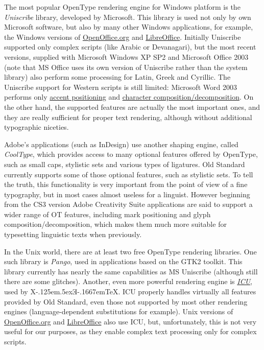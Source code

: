 \documentclass[12pt,a4paper,openany]{book}
\providecommand{\XeTeX}{X\kern-.125em\lower.5ex\hbox{Ǝ}\kern-.1667em\TeX}
\begin{document}
The most popular OpenType rendering engine for Windows platform is the
\textit{Uniscribe} library, developed by Microsoft. This library is used
not only by own Microsoft software, but also by many other Windows
applications, for example, the Windows versions of
\href{http://www.openoffice.org}{OpenOffice.org} and
\href{http://www.libreoffice.org}{LibreOffice}. Initially Uniscribe
supported only complex scripts (like Arabic or Devanagari), but the most
recent versions, supplied with Microsoft Windows XP SP2 and Microsoft
Office 2003 (note that MS Office uses its own version of Uniscribe rather
than the system library) also perform some processing for Latin, Greek and
Cyrillic. The Uniscribe support for Western scripts is still limited:
Microsoft Word 2003 performs only \hyperlink{mark}{accent positioning} and
\hyperlink{ccmp}{character composition/decomposition}. On the other hand,
the supported features are actually the most important ones, and they are
really sufficient for proper text rendering, although without additional
typographic niceties.

Adobe’s applications (such as InDesign) use another shaping engine, called
\textit{CoolType}, which provides access to many optional features offered 
by OpenType, such as small caps, stylistic sets and various types of ligatures. 
Old Standard currently supports some of those optional features, such as 
stylistic sets. To tell the truth, this functionality is very important from
the point of view of a fine typography, but in most cases almost useless for 
a linguist. However beginning from the CS3 version Adobe Creativity Suite
applications are said to support a wider range of OT features, including 
mark positioning and glyph composition/decomposition, which makes them much 
more suitable for typesetting linguistic texts when previously.

In the Unix world, there are at least two free OpenType rendering
libraries. One such library is \textit{Pango}, used in applications based
on the GTK2 toolkit. This library currently has nearly the same
capabilities as MS Uniscribe (although still there are some glitches).
Another, even more powerful rendering engine is
\href{http://icu.sourceforge.net}{\textit{ICU}}, used by \XeTeX. ICU
properly handles virtually all features provided by Old Standard, even those 
not supported by most other rendering engines (language-dependent substitutions 
for example). Unix versions of \href{http://www.openoffice.org}{OpenOffice.org}
and \href{http://www.libreoffice.org}{LibreOffice} also use ICU, but,
unfortunately, this is not very useful for our purposes, as they enable
complex text processing only for complex scripts.
\end{document}
